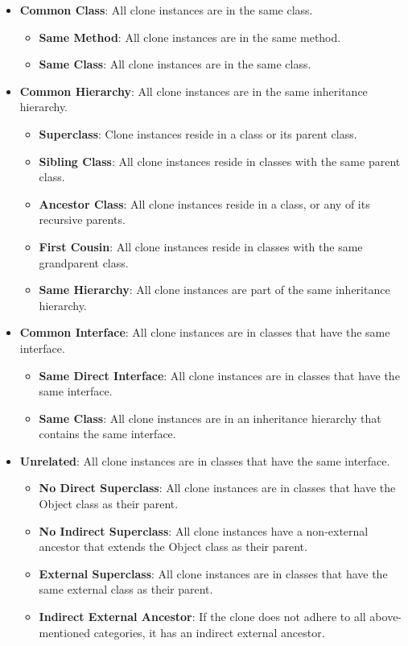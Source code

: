 \documentclass[sigconf,review,anonymous]{acmart}
\begin{document}
\begin{itemize}
    \item \textbf{Common Class}: All clone instances are in the same class.
    \begin{itemize}
        \item \textbf{Same Method}: All clone instances are in the same method.
        \item \textbf{Same Class}: All clone instances are in the same class.
    \end{itemize}
    \item \textbf{Common Hierarchy}: All clone instances are in the same inheritance hierarchy.
    \begin{itemize}
        \item \textbf{Superclass}: Clone instances reside in a class or its parent class.
        \item \textbf{Sibling Class}: All clone instances reside in classes with the same parent class.
        \item \textbf{Ancestor Class}: All clone instances reside in a class, or any of its recursive parents.
        \item \textbf{First Cousin}: All clone instances reside in classes with the same grandparent class.
        \item \textbf{Same Hierarchy}: All clone instances are part of the same inheritance hierarchy.
    \end{itemize}
    \item \textbf{Common Interface}: All clone instances are in classes that have the same interface.
    \begin{itemize}
        \item \textbf{Same Direct Interface}: All clone instances are in classes that have the same interface.
        \item \textbf{Same Class}: All clone instances are in an inheritance hierarchy that contains the same interface.
    \end{itemize}
    \item \textbf{Unrelated}: All clone instances are in classes that have the same interface.
    \begin{itemize}
        \item \textbf{No Direct Superclass}: All clone instances are in classes that have the Object class as their parent.
        \item \textbf{No Indirect Superclass}: All clone instances have a non-external ancestor that extends the Object class as their parent.
        \item \textbf{External Superclass}: All clone instances are in classes that have the same external class as their parent.
        \item \textbf{Indirect External Ancestor}: If the clone does not adhere to all above-mentioned categories, it has an indirect external ancestor.
    \end{itemize}
\end{itemize}
\end{document}
